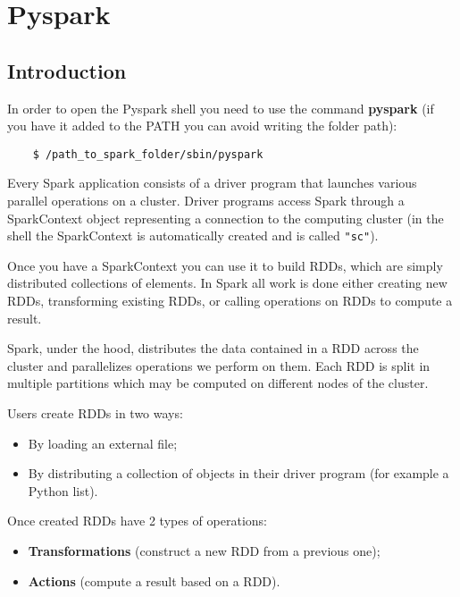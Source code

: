 \section{Pyspark}


\subsection{Introduction}


In order to open the Pyspark shell you need to use the command \textbf{pyspark} (if you have it added to the PATH you can avoid writing the folder path):

\begin{lstlisting}
    $ /path_to_spark_folder/sbin/pyspark
\end{lstlisting}


Every Spark application consists of a driver program that launches various parallel operations on a cluster.
Driver programs access Spark through a SparkContext object representing a connection to the computing cluster (in the shell the SparkContext is automatically created and is called \texttt{"sc"}).

Once you have a SparkContext you can use it to build RDDs, which are simply distributed collections of elements.
In Spark all work is done either creating new RDDs, transforming existing RDDs, or calling operations on RDDs to compute a result.

Spark, under the hood, distributes the data contained in a RDD across the cluster and parallelizes operations we perform on them.
Each RDD is split in multiple partitions which may be computed on different nodes of the cluster.


Users create RDDs in two ways:

\begin{itemize}

    \item By loading an external file;

    \item By distributing a collection of objects in their driver program (for example a Python list).

\end{itemize}

Once created RDDs have 2 types of operations:

\begin{itemize}

    \item \textbf{Transformations} (construct a new RDD from a previous one);

    \item \textbf{Actions} (compute a result based on a RDD).

\end{itemize}


